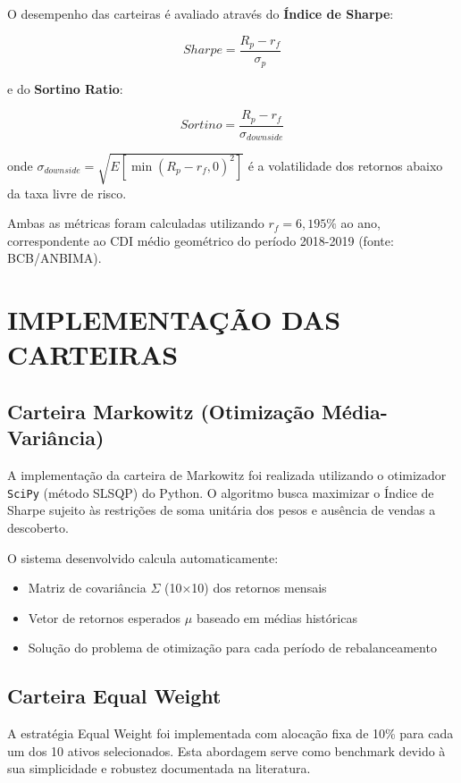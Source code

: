 O desempenho das carteiras é avaliado através do \textbf{Índice de Sharpe}:

\begin{equation}
Sharpe = \frac{R_p - r_f}{\sigma_p}
\end{equation}

e do \textbf{Sortino Ratio}:

\begin{equation}
Sortino = \frac{R_p - r_f}{\sigma_{downside}}
\end{equation}

onde $\sigma_{downside} = \sqrt{E[\min(R_p - r_f, 0)^2]}$ é a volatilidade dos retornos abaixo da taxa livre de risco.

Ambas as métricas foram calculadas utilizando $r_f = 6,195\%$ ao ano, correspondente ao CDI médio geométrico do período 2018-2019 (fonte: BCB/ANBIMA).

\section{IMPLEMENTAÇÃO DAS CARTEIRAS}

\subsection{Carteira Markowitz (Otimização Média-Variância)}

A implementação da carteira de Markowitz foi realizada utilizando o otimizador \texttt{SciPy} (método SLSQP) do Python. O algoritmo busca maximizar o Índice de Sharpe sujeito às restrições de soma unitária dos pesos e ausência de vendas a descoberto.

O sistema desenvolvido calcula automaticamente:
\begin{itemize}
    \item Matriz de covariância $\Sigma$ (10×10) dos retornos mensais
    \item Vetor de retornos esperados $\mu$ baseado em médias históricas
    \item Solução do problema de otimização para cada período de rebalanceamento
\end{itemize}

\subsection{Carteira Equal Weight}

A estratégia Equal Weight foi implementada com alocação fixa de 10\% para cada um dos 10 ativos selecionados. Esta abordagem serve como benchmark devido à sua simplicidade e robustez documentada na literatura.

